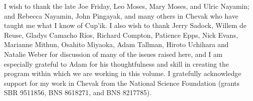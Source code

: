 \documentclass[output=paper]{langscibook}
\begin{document}
I wish to thank the late Joe Friday, Leo Moses, Mary Moses, and Ulric Nayamin; and Rebecca Nayamin, John Pingayak, and many others in Chevak who have taught me what I know of Cup'ik. I also wish to thank Jerry Sadock, Willem de Reuse, Gladys Camacho Ríos, Richard Compton, Patience Epps, Nick Evans, Marianne Mithun, Osahito Miyaoka, Adam Tallman, Hiroto Uchihara and Natalie Weber for discussion of many of the issues raised here, and I am especially grateful to Adam for his thoughtfulness and skill in creating the program within which we are working in this volume. I gratefully acknowledge support for my work in Chevak from the National Science Foundation (grants SBR 9511856, BNS 8618271, and BNS 8217785).


\printglossary

\sloppy\printbibliography[heading=subbibliography,notkeyword=this]
\end{document}
